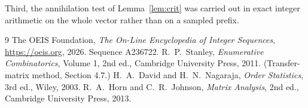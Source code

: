\documentclass[11pt,a4paper]{article}
\theoremstyle{plain}
\theoremstyle{definition}
\begin{document}
Third, the annihilation test of Lemma~\ref{lem:crit} was carried out in exact integer
arithmetic on the whole vector rather than on a sampled prefix.

\begin{thebibliography}{9}
 The OEIS Foundation, \emph{The On-Line Encyclopedia of Integer
Sequences}, \url{https://oeis.org}, 2026. Sequence A236722.
 R.~P.~Stanley, \emph{Enumerative Combinatorics}, Volume 1, 2nd ed.,
Cambridge University Press, 2011. (Transfer-matrix method, Section 4.7.)
 H.~A.~David and H.~N.~Nagaraja, \emph{Order Statistics}, 3rd ed., Wiley,
2003.
 R.~A.~Horn and C.~R.~Johnson, \emph{Matrix Analysis}, 2nd ed., Cambridge
University Press, 2013.
\end{thebibliography}
\end{document}
